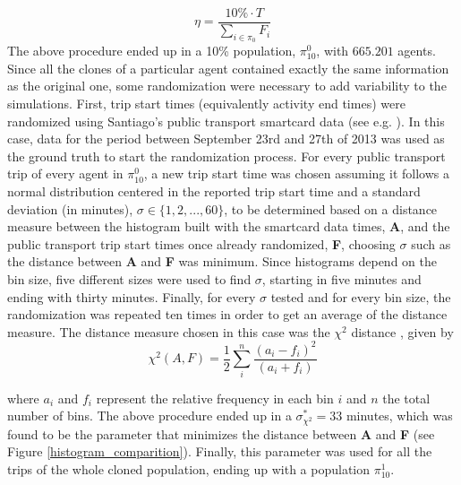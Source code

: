 \documentclass[Journal,letterpaper]{ascelike-new}
\begin{document}
\begin{equation}
    \eta=\frac{10\%\cdot T}{\sum\limits_{\mathit{i}\in \pi_{0}}F_\mathit{i}}
\end{equation}
The above procedure ended up in a 10\% population, $\pi_{10}^{0}$, with $665.201$ agents. Since all the clones of a particular agent contained exactly the same information as the original one, some randomization were necessary to add variability to the simulations. First, trip start times (equivalently activity end times) were randomized using Santiago's public transport smartcard data (see e.g. \cite{munizaga2012estimation}). In this case, data for the period between September 23rd and 27th of 2013 was used as the ground truth to start the randomization process. For every public transport trip of every agent in $\pi_{10}^{0}$, a new trip start time was chosen assuming it follows a normal distribution centered in the reported trip start time and a standard deviation (in minutes), $\sigma \in \{1,2,...,60\}$, to be determined based on a distance measure between the histogram built with the smartcard data times, \textbf{A}, and the public transport trip start times once already randomized, \textbf{F}, choosing $\sigma$ such as the distance between \textbf{A} and \textbf{F} was minimum. Since histograms depend on the bin size, five different sizes were used to find $\sigma$, starting in five minutes and ending with thirty minutes. Finally, for every $\sigma$ tested and for every bin size, the randomization was repeated ten times in order to get an average of the distance measure. The distance measure chosen in this case was the $\chi^2$ distance \citep{pele2010quadratic}, given by
\begin{equation}
    \chi^2(A,F)=\frac{1}{2}\sum_{\mathit{i}}^{n}\frac{(a_{\mathit{i}}-f_{\mathit{i}})^2}{(a_{\mathit{i}}+f_{\mathit{i}})}
\end{equation}

where $a_{i}$ and $f_{i}$ represent the relative frequency in each bin $i$ and $n$ the total number of bins. The above procedure ended up in a $\sigma_{\chi^2}^{*}=33$ minutes, which was found to be the parameter that minimizes the distance between \textbf{A} and \textbf{F} (see Figure \ref{histogram_comparition}). 
Finally, this parameter was used for all the trips of the whole cloned population, ending up with a population $\pi_{10}^{1}$.
\end{document}
